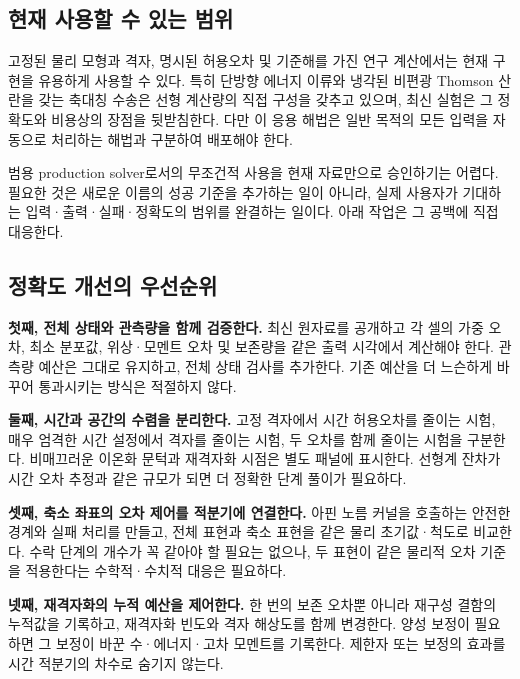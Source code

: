 \documentclass[
  10pt,
  a4paper,
]{article}
\begin{document}
\hypertarget{uxd604uxc7ac-uxc0acuxc6a9uxd560-uxc218-uxc788uxb294-uxbc94uxc704}{%
\subsection{현재 사용할 수 있는
범위}\label{uxd604uxc7ac-uxc0acuxc6a9uxd560-uxc218-uxc788uxb294-uxbc94uxc704}}

고정된 물리 모형과 격자, 명시된 허용오차 및 기준해를 가진 연구
계산에서는 현재 구현을 유용하게 사용할 수 있다. 특히 단방향 에너지
이류와 냉각된 비편광 Thomson 산란을 갖는 축대칭 수송은 선형 계산량의
직접 구성을 갖추고 있으며, 최신 실험은 그 정확도와 비용상의 장점을
뒷받침한다. 다만 이 응용 해법은 일반 목적의 모든 입력을 자동으로
처리하는 해법과 구분하여 배포해야 한다.

범용 production solver로서의 무조건적 사용을 현재 자료만으로 승인하기는
어렵다. 필요한 것은 새로운 이름의 성공 기준을 추가하는 일이 아니라, 실제
사용자가 기대하는 입력·출력·실패·정확도의 범위를 완결하는 일이다. 아래
작업은 그 공백에 직접 대응한다.

\hypertarget{uxc815uxd655uxb3c4-uxac1cuxc120uxc758-uxc6b0uxc120uxc21cuxc704}{%
\subsection{정확도 개선의
우선순위}\label{uxc815uxd655uxb3c4-uxac1cuxc120uxc758-uxc6b0uxc120uxc21cuxc704}}

\textbf{첫째, 전체 상태와 관측량을 함께 검증한다.} 최신 원자료를
공개하고 각 셀의 가중 오차, 최소 분포값, 위상·모멘트 오차 및 보존량을
같은 출력 시각에서 계산해야 한다. 관측량 예산은 그대로 유지하고, 전체
상태 검사를 추가한다. 기존 예산을 더 느슨하게 바꾸어 통과시키는 방식은
적절하지 않다.

\textbf{둘째, 시간과 공간의 수렴을 분리한다.} 고정 격자에서 시간
허용오차를 줄이는 시험, 매우 엄격한 시간 설정에서 격자를 줄이는 시험, 두
오차를 함께 줄이는 시험을 구분한다. 비매끄러운 이온화 문턱과 재격자화
시점은 별도 패널에 표시한다. 선형계 잔차가 시간 오차 추정과 같은 규모가
되면 더 정확한 단계 풀이가 필요하다.

\textbf{셋째, 축소 좌표의 오차 제어를 적분기에 연결한다.} 아핀 노름
커널을 호출하는 안전한 경계와 실패 처리를 만들고, 전체 표현과 축소
표현을 같은 물리 초기값·척도로 비교한다. 수락 단계의 개수가 꼭 같아야 할
필요는 없으나, 두 표현이 같은 물리적 오차 기준을 적용한다는
수학적·수치적 대응은 필요하다.

\textbf{넷째, 재격자화의 누적 예산을 제어한다.} 한 번의 보존 오차뿐
아니라 재구성 결함의 누적값을 기록하고, 재격자화 빈도와 격자 해상도를
함께 변경한다. 양성 보정이 필요하면 그 보정이 바꾼 수·에너지·고차
모멘트를 기록한다. 제한자 또는 보정의 효과를 시간 적분기의 차수로 숨기지
않는다.
\end{document}
